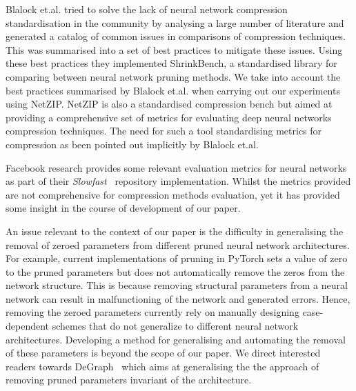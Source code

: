 Blalock et.al.\cite{Blalock2020} tried to solve the lack of neural network compression standardisation in the community by analysing a large number of literature and generated a catalog of common issues in comparisons of compression techniques.
%
This was summarised into a set of best practices to mitigate these issues. Using these best practices they implemented ShrinkBench, a standardised library for comparing between neural network pruning methods. 
%
%
We take into account the best practices summarised by Blalock et.al.\cite{Blalock2020} when carrying out our experiments using NetZIP. 
%
NetZIP is also a standardised compression bench but aimed at providing a comprehensive set of metrics for evaluating deep neural networks compression techniques. The need for such a tool standardising metrics for compression as been pointed out implicitly by Blalock et.al. 

Facebook research provides some relevant evaluation metrics for neural networks as part of their \textit{Slowfast}~\cite{fan2020pyslowfast} repository implementation. Whilst the metrics provided are not comprehensive for compression methods evaluation, yet it has provided some insight in the course of development of our paper.

An issue relevant to the context of our paper is the difficulty in generalising the removal of zeroed parameters from different pruned neural network architectures. For example, current implementations of pruning in PyTorch sets a value of zero to the pruned parameters but does not automatically remove the zeros from the network structure. This is because removing structural parameters from a neural network can result in malfunctioning of the network and generated errors. 
%
Hence, removing the zeroed parameters currently rely on manually designing case-dependent schemes that do not generalize to different neural network architectures. 
%
Developing a method for generalising and automating the removal of these parameters is beyond the scope of our paper. 
We direct interested readers towards DeGraph~\cite{fang2023depgraph} which aims at generalising the the approach of removing pruned parameters invariant of the architecture. 
%


